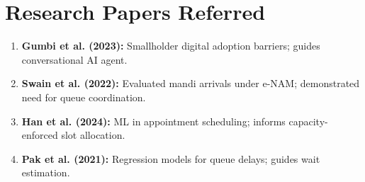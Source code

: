 \section{Research Papers Referred}
\begin{enumerate}[noitemsep, topsep=1pt, parsep=0pt, partopsep=0pt]
  \item \textbf{Gumbi et al. (2023):} Smallholder digital adoption barriers; guides conversational AI agent.
  \item \textbf{Swain et al. (2022):} Evaluated mandi arrivals under e-NAM; demonstrated need for queue coordination.
  \item \textbf{Han et al. (2024):} ML in appointment scheduling; informs capacity-enforced slot allocation.
  \item \textbf{Pak et al. (2021):} Regression models for queue delays; guides wait estimation.
\end{enumerate}
